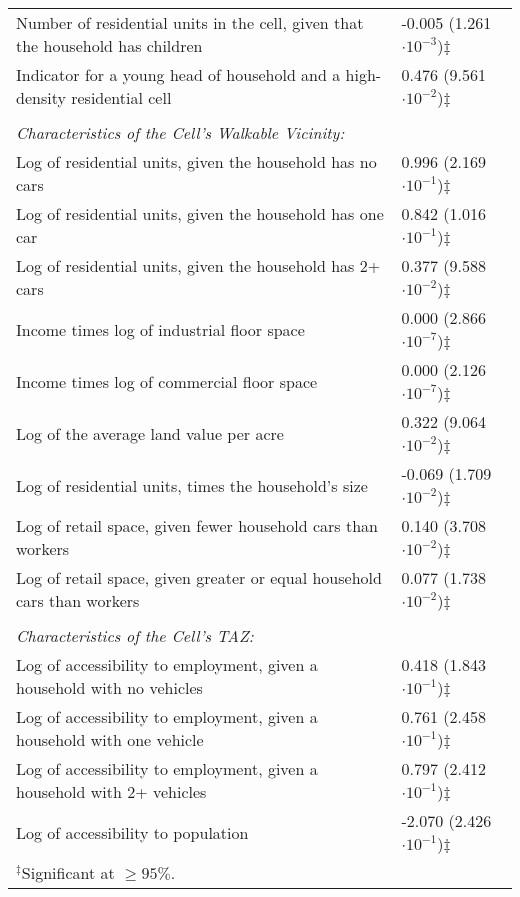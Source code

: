\begin{tabular}{p{4.25in}l}
Number of residential units in the cell, given that the household has children                  &         -0.005 (1.261$\cdot 10^{-3}$)$\ddagger$   \\
Indicator for a young head of household and a high-density residential cell                     &          0.476 (9.561$\cdot 10^{-2}$)$\ddagger$   \\
\\ \multicolumn{2}{l}{\emph{Characteristics of the Cell's Walkable Vicinity:}} \\
Log of residential units, given the household has no cars                                       &          0.996 (2.169$\cdot 10^{-1}$)$\ddagger$   \\
Log of residential units, given the household has one car                                       &          0.842 (1.016$\cdot 10^{-1}$)$\ddagger$   \\
Log of residential units, given the household has 2+ cars                                       &          0.377 (9.588$\cdot 10^{-2}$)$\ddagger$   \\
Income times log of industrial floor space                                                      &          0.000 (2.866$\cdot 10^{-7}$)$\ddagger$   \\
Income times log of commercial floor space                                                      &          0.000 (2.126$\cdot 10^{-7}$)$\ddagger$   \\
Log of the average land value per acre                                                          &          0.322 (9.064$\cdot 10^{-2}$)$\ddagger$   \\
Log of residential units, times the household's size                                            &         -0.069 (1.709$\cdot 10^{-2}$)$\ddagger$   \\
Log of retail space, given fewer household cars than workers                                    &          0.140 (3.708$\cdot 10^{-2}$)$\ddagger$   \\
Log of retail space, given greater or equal household cars than workers                         &          0.077 (1.738$\cdot 10^{-2}$)$\ddagger$   \\
\\ \multicolumn{2}{l}{\emph{Characteristics of the Cell's TAZ:}} \\
Log of accessibility to employment, given a household with no vehicles                          &          0.418 (1.843$\cdot 10^{-1}$)$\ddagger$   \\
Log of accessibility to employment, given a household with one vehicle                          &          0.761 (2.458$\cdot 10^{-1}$)$\ddagger$   \\
Log of accessibility to employment, given a household with 2+ vehicles                          &          0.797 (2.412$\cdot 10^{-1}$)$\ddagger$   \\
Log of accessibility to population                                                              &         -2.070 (2.426$\cdot 10^{-1}$)$\ddagger$   \\
\midrule
$^{\ddagger}$Significant at $\geq95\%$. \\
\bottomrule
\end{tabular}
